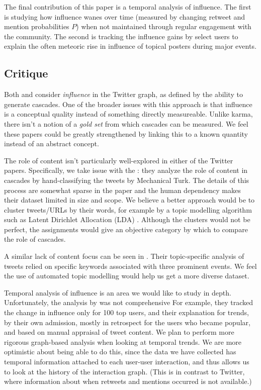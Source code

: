 \documentclass[10pt]{article}
\begin{document}
The final contribution of this paper is a temporal analysis of influence. The
first is studying how influence wanes over time (measured by changing retweet
and mention probabilities $P$) when not maintained through regular engagement
with the community. The second is tracking the influence gains by select users
to explain the often meteoric rise in influence of topical posters during major
events.

\subsection{Critique}
Both \citet{bakshy2011everyone} and \citet{cha2010measuring} consider
\textit{influence} in the Twitter graph, as defined by the ability to generate
cascades. One of the broader issues with this approach is that influence
is a conceptual quality instead of something directly measureable. Unlike karma,
there isn't a notion of a \textit{gold set} from which cascades can be measured.
We feel these papers could be greatly strengthened by linking this to a known
quantity instead of an abstract concept.

The role of content isn't particularly well-explored in either of the Twitter papers.
Specifically, we take issue with the \citet{bakshy2011everyone}: they analyze
the role of content in cascades by hand-classifying the tweets by Mechanical Turk.
The details of this process are somewhat sparse in the paper and the human
dependency makes their dataset limited in size and scope. We believe a better
approach would be to cluster tweets/URLs by their words, for example by
a topic modelling algorithm such as Latent Dirichlet Allocation (LDA)
\citep{blei2003latent}. Although the clusters would not be perfect, the assignments
would give an objective category by which to compare the role of cascades.

A similar lack of content focus can be seen in \citet{cha2010measuring}. Their
topic-specific analysis of tweets relied on specific keywords associated with
three prominent events. We feel the use of automated topic modelling would help us get a more
diverse dataset.

Temporal analysis of influence is an area we would like to study in depth.
Unfortunately, the analysis by \citet{cha2010measuring} was not comprehensive
For example, they tracked the change in influence only for 100 top users, and
their explanation for trends, by their own admission, mostly in retrospect for
the users who became popular, and based on manual appraisal of tweet content.
We plan to perform more rigorous graph-based analysis when looking at temporal
trends. We are more optimistic about being able to do this, since the data we
have collected has temporal information attached to each user-user interaction,
and thus allows us to look at the history of the interaction graph.  (This is in
contrast to Twitter, where information about when retweets and mentions occurred
is not available.)
\end{document}
